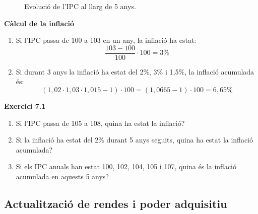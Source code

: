 \documentclass[12pt]{article}
\begin{document}
\begin{figure}[H]
\centering
{}
\caption{Evolució de l'IPC al llarg de 5 anys.}
\end{figure}

\begin{exemple}
\textbf{Càlcul de la inflació}
\begin{enumerate}[label=\alph*)]
    \item Si l'IPC passa de 100 a 103 en un any, la inflació ha estat:
    \[
    \dfrac{103-100}{100} \cdot 100 = 3\%
    \]
    \item Si durant 3 anys la inflació ha estat del 2\%, 3\% i 1{,}5\%, la inflació acumulada és:
    \[
    (1{,}02 \cdot 1{,}03 \cdot 1{,}015 - 1) \cdot 100 = (1{,}0665 - 1) \cdot 100 = 6{,}65\%
    \]
\end{enumerate}
\end{exemple}

\begin{exercici}
\textbf{Exercici 7.1}\\
\begin{enumerate}[label=\alph*)]
    \item Si l'IPC passa de 105 a 108, quina ha estat la inflació?
    \item Si la inflació ha estat del 2\% durant 5 anys seguits, quina ha estat la inflació acumulada?
    \item Si els IPC anuals han estat 100, 102, 104, 105 i 107, quina és la inflació acumulada en aquests 5 anys?
\end{enumerate}
\end{exercici}

\subsection{Actualització de rendes i poder adquisitiu}
\end{document}
